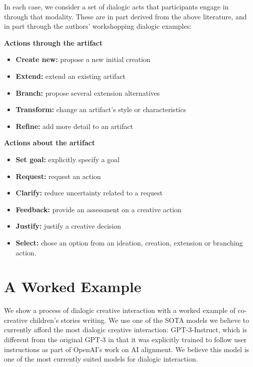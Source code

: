 \documentclass[manuscript,review]{acmart}
\begin{document}
In each case, we consider a set of dialogic acts that participants engage in through that modality. These are in part derived from the above literature, and in part through the authors' workshopping dialogic examples:

\textbf{Actions through the artifact}


\begin{itemize}

  \item \relax \textbf{Create new:} propose a new initial creation
  \item \relax \textbf{Extend:} extend an existing artifact
   \item \relax \textbf{Branch:} propose several extension alternatives
  \item \relax \textbf{Transform:} change an artifact's style or characteristics
  \item \relax \textbf{Refine:} add more detail to an artifact 
 
\end{itemize}

  \textbf{Actions about the artifact}
  
\begin{itemize}
  \item \relax \textbf{Set goal:} explicitly specify a goal
  \item \relax \textbf{Request:} request an action
  \item \relax \textbf{Clarify:} reduce uncertainty related to a request
  \item \relax \textbf{Feedback:} provide an assessment on a creative action
  \item \relax \textbf{Justify:} justify a creative decision
  \item \relax \textbf{Select:} chose an option from an ideation, creation, extension or branching action.
\end{itemize}

\section{A Worked Example}
We show a process of dialogic creative interaction with a worked example of co-creative children's stories writing. We use one of the SOTA models we believe to currently afford the most dialogic creative interaction: GPT-3-Instruct, which is different from the original GPT-3 in that it was explicitly trained to follow user instructions as part of OpenAI's work on AI alignment. We believe this model is one of the most currently suited models for dialogic interaction.
\end{document}
